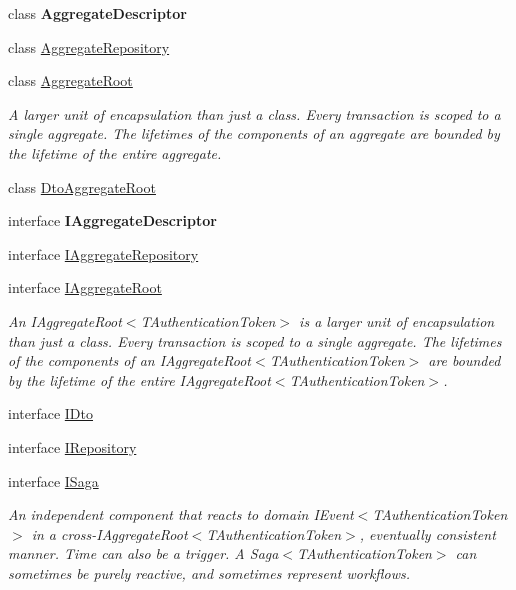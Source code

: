 \begin{DoxyCompactItemize}
\item 
class {\bfseries Aggregate\+Descriptor}
\item 
class \hyperlink{classCqrs_1_1Domain_1_1AggregateRepository}{Aggregate\+Repository}
\item 
class \hyperlink{classCqrs_1_1Domain_1_1AggregateRoot}{Aggregate\+Root}
\begin{DoxyCompactList}\small\item\em A larger unit of encapsulation than just a class. Every transaction is scoped to a single aggregate. The lifetimes of the components of an aggregate are bounded by the lifetime of the entire aggregate. \end{DoxyCompactList}\item 
class \hyperlink{classCqrs_1_1Domain_1_1DtoAggregateRoot}{Dto\+Aggregate\+Root}
\item 
interface {\bfseries I\+Aggregate\+Descriptor}
\item 
interface \hyperlink{interfaceCqrs_1_1Domain_1_1IAggregateRepository}{I\+Aggregate\+Repository}
\item 
interface \hyperlink{interfaceCqrs_1_1Domain_1_1IAggregateRoot}{I\+Aggregate\+Root}
\begin{DoxyCompactList}\small\item\em An I\+Aggregate\+Root$<$\+T\+Authentication\+Token$>$ is a larger unit of encapsulation than just a class. Every transaction is scoped to a single aggregate. The lifetimes of the components of an I\+Aggregate\+Root$<$\+T\+Authentication\+Token$>$ are bounded by the lifetime of the entire I\+Aggregate\+Root$<$\+T\+Authentication\+Token$>$. \end{DoxyCompactList}\item 
interface \hyperlink{interfaceCqrs_1_1Domain_1_1IDto}{I\+Dto}
\item 
interface \hyperlink{interfaceCqrs_1_1Domain_1_1IRepository}{I\+Repository}
\item 
interface \hyperlink{interfaceCqrs_1_1Domain_1_1ISaga}{I\+Saga}
\begin{DoxyCompactList}\small\item\em An independent component that reacts to domain I\+Event$<$\+T\+Authentication\+Token$>$ in a cross-\/I\+Aggregate\+Root$<$\+T\+Authentication\+Token$>$, eventually consistent manner. Time can also be a trigger. A Saga$<$\+T\+Authentication\+Token$>$ can sometimes be purely reactive, and sometimes represent workflows. \end{DoxyCompactList}\item 

\end{DoxyCompactItemize}
